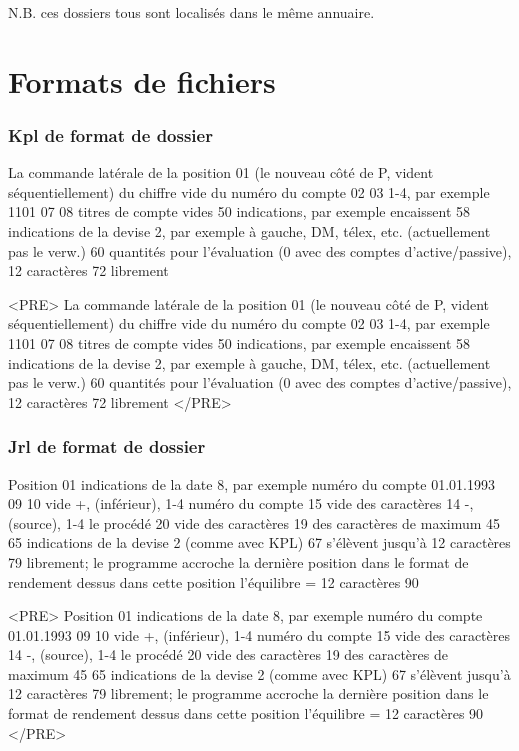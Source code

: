 \documentclass[12pt]{report}
\begin{document}
\begin{appendix}

 N.B.  ces dossiers tous sont localisés dans le même annuaire.

\chapter{Formats de fichiers}

\subsection{ Kpl de format de dossier}

La commande latérale de la position 01 (le nouveau côté de P, vident
séquentiellement) du chiffre vide du numéro du compte 02 03 1-4, par exemple
1101 07 08 titres de compte vides 50 indications, par exemple encaissent 58
indications de la devise 2, par exemple à gauche, DM, télex, etc.
(actuellement pas le verw.)  60 quantités pour l'évaluation (0 avec des comptes
d'active/passive), 12 caractères 72 librement 

 <PRE> La commande latérale de la position 01 (le nouveau côté de P, vident séquentiellement) du chiffre vide du numéro du compte 02 03 1-4, par exemple 1101 07 08 titres de compte vides 50 indications, par exemple encaissent 58 indications de la devise 2, par exemple à gauche, DM, télex, etc. (actuellement pas le verw.)  60 quantités pour l'évaluation (0 avec des comptes d'active/passive), 12 caractères 72 librement </PRE>


\subsection{ Jrl de format de dossier}

Position 01 indications de la date 8, par exemple numéro du compte 01.01.1993
09 10 vide +, (inférieur), 1-4 numéro du compte 15 vide des caractères 14 -,
(source), 1-4 le procédé 20 vide des caractères 19 des caractères de maximum 45
65 indications de la devise 2 (comme avec KPL) 67 s'élèvent jusqu'à 12
caractères 79 librement;  le programme accroche la dernière position dans le
format de rendement dessus dans cette position l'équilibre = 12 caractères 90

 <PRE> Position 01 indications de la date 8, par exemple numéro du compte 01.01.1993 09 10 vide +, (inférieur), 1-4 numéro du compte 15 vide des caractères 14 -, (source), 1-4 le procédé 20 vide des caractères 19 des caractères de maximum 45 65 indications de la devise 2 (comme avec KPL) 67 s'élèvent jusqu'à 12 caractères 79 librement;  le programme accroche la dernière position dans le format de rendement dessus dans cette position l'équilibre = 12 caractères 90 </PRE>


\end{appendix}
\end{document}
